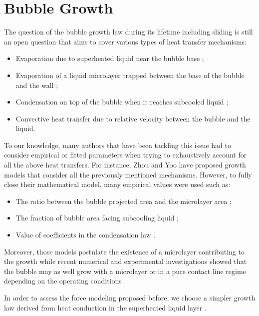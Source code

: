 \section{Bubble Growth}


The question of the bubble growth law during its lifetime including sliding is still an open question that aims to cover various types of heat transfer mechanisms:

\begin{itemize}
\item Evaporation due to superheated liquid near the bubble base ;
\item Evaporation of a liquid microlayer trapped between the base of the bubble and the wall ;
\item Condensation on top of the bubble when it reaches subcooled liquid ;
\item Convective heat transfer due to relative velocity between the bubble and the liquid.
\end{itemize}

To our knowledge, many authors that have been tackling this issue had to consider empirical or fitted parameters when trying to exhaustively account for all the above heat transfers. For instance, Zhou \cite{zhou_experimental_2020} and Yoo \cite{yoo_development_2018} have proposed growth models that consider all the previously mentioned mechanisms. However, to fully close their mathematical model, many empirical values were used such as:

\begin{itemize}
\item The ratio between the bubble projected area and the microlayer area ;
\item The fraction of bubble area facing subcooling liquid ;
\item Value of coefficients in the condensation law \cite{levenspiel_collapse_1959}.
\end{itemize}

Moreover, those models postulate the existence of a microlayer contributing to the growth while recent numerical and experimental investigations showed that the bubble may as well grow with a microlayer or in a pure contact line regime depending on the operating conditions \cite{urbano_direct_2018, bures_modelling_2021, kossolapov_experimental_2021}.

In order to assess the force modeling proposed before, we choose a simpler growth law derived from heat conduction in the superheated liquid layer \cite{plesset_growth_1954}. 

